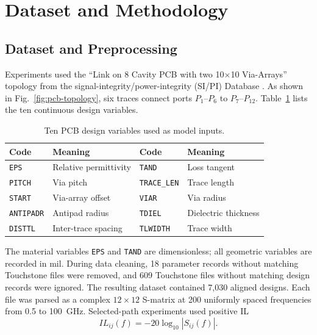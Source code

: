 \section{Dataset and Methodology}
\label{sec:methodology}

\subsection{Dataset and Preprocessing}
Experiments used the ``Link on 8 Cavity PCB with two 10$\times$10 Via-Arrays'' topology
from the signal-integrity/power-integrity (SI/PI) Database \cite{schierholz2021sipi}. As
shown in Fig.~\ref{fig:pcb-topology}, six traces connect ports $P_1$--$P_6$ to
$P_7$--$P_{12}$. Table~\ref{tab:pcb-variables} lists the ten continuous design
variables.

\begin{table}[htbp]
    \caption{Ten PCB design variables used as model inputs.}
    \label{tab:pcb-variables}
    \centering
    \scriptsize
    \setlength{\tabcolsep}{3pt}
    \begin{tabular}{@{}lp{}lp{}@{}}
        \toprule
        \textbf{Code} & \textbf{Meaning} & \textbf{Code} & \textbf{Meaning} \\
        \midrule
        \texttt{EPS}        & Relative permittivity & \texttt{TAND}      & Loss tangent
          \\
        \texttt{PITCH}      & Via pitch & \texttt{TRACE\_LEN} & Trace length \\
        \texttt{START}      & Via-array offset & \texttt{VIAR}      & Via radius \\
        \texttt{ANTIPADR}   & Antipad radius & \texttt{TDIEL}     & Dielectric thickness
          \\
        \texttt{DISTTL}     & Inter-trace spacing & \texttt{TLWIDTH}   & Trace width \\
        \bottomrule
    \end{tabular}
\end{table}

The material variables \texttt{EPS} and \texttt{TAND} are dimensionless; all geometric
variables are recorded in mil. During data cleaning, 18 parameter records without
matching Touchstone files were removed, and 609 Touchstone files without matching design
records were ignored. The resulting dataset contained 7,030 aligned designs. Each file
was parsed as a complex $12\times12$ S-matrix at 200 uniformly spaced frequencies from
0.5 to 100~GHz. Selected-path experiments used positive IL
\begin{equation}
    IL_{ij}(f)=-20\log_{10}|S_{ij}(f)|.
    \label{eq:insertion-loss}
\end{equation}


